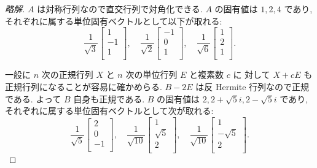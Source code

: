 \documentclass[12pt,twoside]{jarticle}
\begin{document}
\begin{proof}[\protect{[150]}略解]
  $A$ は対称行列なので直交行列で対角化できる.
  $A$ の固有値は $1,2,4$ であり, 
  それぞれに属する単位固有ベクトルとして以下が取れる:
  \begin{equation*}
    \frac{1}{\sqrt{3}}
    \begin{bmatrix}
      1 \\ -1 \\ 1 \\
    \end{bmatrix}, 
    \quad
    \frac{1}{\sqrt{2}}
    \begin{bmatrix}
      -1 \\ 0 \\ 1 \\
    \end{bmatrix}, 
    \quad
    \frac{1}{\sqrt{6}}
    \begin{bmatrix}
      1 \\ 2 \\ 1 \\
    \end{bmatrix}.
  \end{equation*}

  一般に $n$ 次の正規行列 $X$ と $n$ 次の単位行列 $E$ と複素数 $c$ に
  対して $X+cE$ も正規行列になることが容易に確かめらる.
  $B-2E$ は反 Hermite 行列なので正規である. 
  よって $B$ 自身も正規である.
  $B$ の固有値は $2, 2+\sqrt{5}i, 2-\sqrt{5}i$ であり,
  それぞれに属する単位固有ベクトルとして次が取れる:
  \begin{equation*}
    \frac{1}{\sqrt{5}}
    \begin{bmatrix}
      2 \\ 0 \\ -1 \\
    \end{bmatrix},
    \quad
    \frac{1}{\sqrt{10}}
    \begin{bmatrix}
      1 \\ \sqrt{5} \\ 2 \\
    \end{bmatrix},
    \quad
    \frac{1}{\sqrt{10}}
    \begin{bmatrix}
      1 \\ -\sqrt{5} \\ 2 \\
    \end{bmatrix}.
  \end{equation*}


\end{proof}
\end{document}
